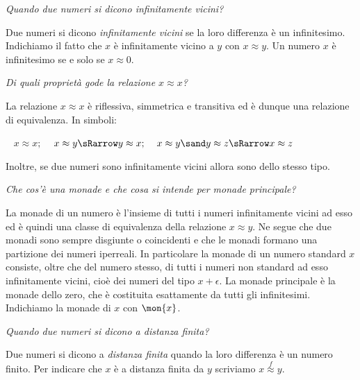 \begin{esercizio}\label{ese:iper_018} 
\emph{Quando due numeri si dicono \emph{infinitamente vicini}?}

Due numeri si dicono \emph{infinitamente vicini} se la loro differenza è un 
infinitesimo. Indichiamo il fatto che \(x\) è infinitamente vicino a \(y\) 
con \(x \approx y\). 
Un numero \(x\) è infinitesimo se e solo se \(x \approx 0\).
\end{esercizio}

\begin{esercizio}\label{ese:iper_019} 
\emph{Di quali proprietà gode la relazione \(x \approx x\)?}

La relazione \(x \approx x\) è riflessiva, simmetrica e transitiva ed è 
dunque una relazione di equivalenza. In simboli:
\begin{center}
\textbullet ~ \(x \approx x; \) \qquad 
\textbullet ~ \(x \approx y \sRarrow y \approx x;\) \qquad 
\textbullet ~ \(x \approx y \sand y \approx z \sRarrow x \approx z\)
\end{center}
Inoltre, se due numeri sono infinitamente vicini allora sono dello stesso 
tipo.
\end{esercizio}


\begin{esercizio}\label{ese:iper_020} 
\emph{Che cos'è una monade e che cosa si intende per monade principale?}

La monade di un numero è l'insieme di tutti i numeri infinitamente vicini 
ad esso ed è quindi una classe di equivalenza della relazione 
\(x \approx y\). 
Ne segue che due monadi sono sempre disgiunte o coincidenti e che le 
monadi formano una partizione dei numeri iperreali. 
In particolare la monade di un numero standard \(x\) consiste, oltre che del 
numero stesso, di tutti i numeri non standard ad esso infinitamente vicini, 
cioè dei numeri del tipo \(x + \epsilon\). 
La monade principale è la monade dello zero, che è costituita esattamente da 
tutti gli infinitesimi. Indichiamo la monade di \(x\) con \(\mon{x}\).
\end{esercizio}

\begin{esercizio}\label{ese:iper_021} 
\emph{Quando due numeri si dicono a \emph{distanza finita}?}

Due numeri si dicono a \emph{distanza finita} quando la loro differenza è un 
numero finito. 
Per indicare che \(x\) è a distanza finita da \(y\) scriviamo 
\(x \stackrel{f}{\approx} y\).
\end{esercizio}

